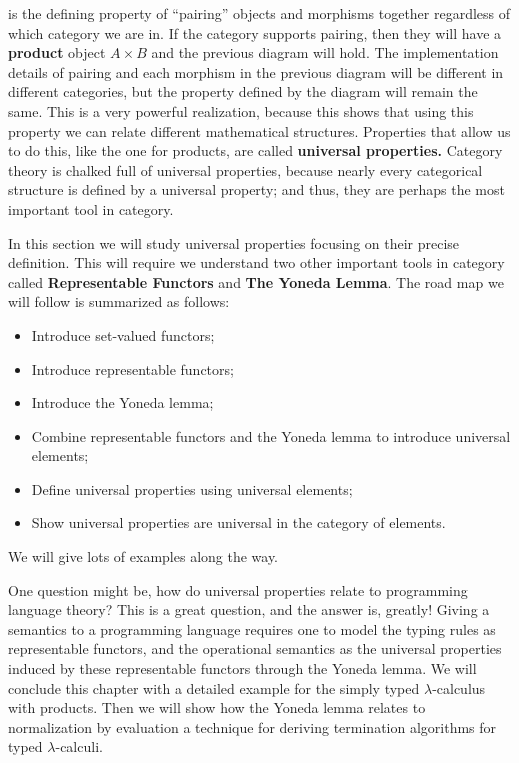 is the defining property of ``pairing'' objects and morphisms together
regardless of which category we are in.  If the category supports
pairing, then they will have a \textbf{product} object $A \times B$
and the previous diagram will hold. The implementation details of
pairing and each morphism in the previous diagram will be different in
different categories, but the property defined by the diagram will
remain the same. This is a very powerful realization, because this
shows that using this property we can relate different mathematical
structures.  Properties that allow us to do this, like the one for
products, are called \textbf{universal properties.}  Category theory
is chalked full of universal properties, because nearly every
categorical structure is defined by a universal property; and thus,
they are perhaps the most important tool in category.

In this section we will study universal properties focusing on their
precise definition.  This will require we understand two other
important tools in category called \textbf{Representable Functors} and
\textbf{The Yoneda Lemma}.  The road map we will follow is summarized
as follows:
\begin{itemize}
\item Introduce set-valued functors;
\item Introduce representable functors;
\item Introduce the Yoneda lemma;
\item Combine representable functors and the Yoneda lemma to introduce
  universal elements;
\item Define universal properties using universal elements;
\item Show universal properties are universal in the category of
  elements.
\end{itemize}
We will give lots of examples along the way.

One question might be, how do universal properties relate to
programming language theory?  This is a great question, and the answer
is, greatly!  Giving a semantics to a programming language requires
one to model the typing rules as representable functors, and the
operational semantics as the universal properties induced by these
representable functors through the Yoneda lemma.  We will conclude
this chapter with a detailed example for the simply typed
$\lambda$-calculus with products.  Then we will show how the Yoneda
lemma relates to normalization by evaluation a technique for deriving
termination algorithms for typed $\lambda$-calculi.


